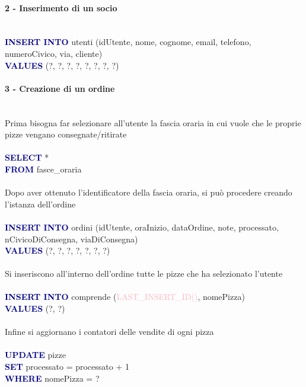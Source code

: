 \documentclass[a4paper,12pt, oneside]{article}
\begin{document}
\paragraph{2 - Inserimento di un socio}
\hphantom{A}\\    %
\textcolor{darkBlue}{\textbf{INSERT INTO}} utenti (idUtente, nome, cognome, email, telefono, numeroCivico, via, cliente)
\\\textcolor{darkBlue}{\textbf{VALUES}} (?, ?, ?, ?, ?, ?, ?, ?)

\paragraph{3 - Creazione di un ordine}
\hphantom{A}\\    %
Prima bisogna far selezionare all'utente la fascia oraria in cui vuole che le proprie pizze vengano consegnate/ritirate
\\\\
\textcolor{darkBlue}{\textbf{SELECT}} *
\\\textcolor{darkBlue}{\textbf{FROM}} fasce\_oraria
\\\\
Dopo aver ottenuto l'identificatore della fascia oraria, si può procedere creando l'istanza dell'ordine
\\\\
\textcolor{darkBlue}{\textbf{INSERT INTO}} ordini (idUtente, oraInizio, dataOrdine, note, processato, nCivicoDiConsegna, viaDiConsegna)
\\\textcolor{darkBlue}{\textbf{VALUES}} (?, ?, ?, ?, ?, ?, ?)
\\\\
Si inseriscono all'interno dell'ordine tutte le pizze che ha selezionato l'utente
\\\\
\textcolor{darkBlue}{\textbf{INSERT INTO}} comprende (\textcolor{lightPink}{LAST\_INSERT\_ID()}, nomePizza)
\\\textcolor{darkBlue}{\textbf{VALUES}} (?, ?)
\\\\
Infine si aggiornano i contatori delle vendite di ogni pizza
\\\\
\textcolor{darkBlue}{\textbf{UPDATE}} pizze
\\\textcolor{darkBlue}{\textbf{SET}} processato = processato + 1
\\\textcolor{darkBlue}{\textbf{WHERE}} nomePizza = ?
\end{document}
